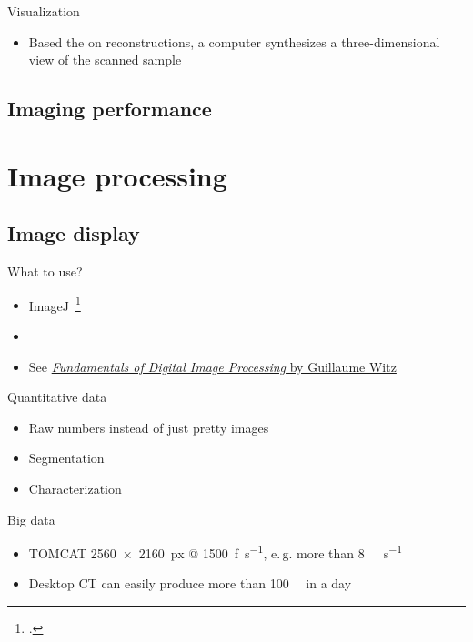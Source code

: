 \documentclass[aspectratio=169,10pt]{beamer}
\newcommand{\uct}{\si{\micro}CT\xspace}%
\newcommand{\eg}{e.\,g.\xspace}%
\begin{document}
\begin{frame}{Visualization}
	\begin{itemize}
		\item Based the on reconstructions, a computer synthesizes a three-dimensional view of the scanned sample
	\end{itemize}
\end{frame}

\subsection{Imaging performance}

\section{Image processing}
\subsection{Image display}

\begin{frame}{What to use?}
	\begin{itemize}
		\item ImageJ~\footcite{Schindelin2012}
		\item \faPython%
		\item See \href{https://ilias.unibe.ch/goto_ilias3_unibe_sess_1561468.html}{\emph{Fundamentals of Digital Image Processing} by Guillaume Witz}
	\end{itemize}
\end{frame}

\begin{frame}{Quantitative data}
	\begin{itemize}
		\item Raw numbers instead of just pretty images
		\item Segmentation
		\item Characterization
	\end{itemize}
\end{frame}

\begin{frame}{Big data}
	\begin{itemize}
		\item TOMCAT \SI{2560x2160}{px} @ \SI{1500}{f\per\second}, \eg{} more than \SI{8}{\giga\byte\per\second}
		\item Desktop \uct{} can easily produce more than \SI{100}{\giga\byte} in a day
	\end{itemize}
\end{frame}
\end{document}
